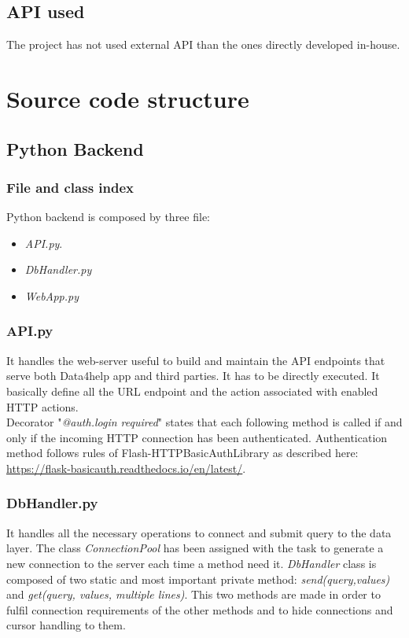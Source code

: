 \documentclass{article}
\begin{document}
\subsection{API used}
The project has not used external API than the ones directly developed in-house.

\section{Source code structure}
\subsection{Python Backend}
\subsubsection{File and class index}
Python backend is composed by three file:
\begin{itemize}
	\item \textit{API.py}.
	\item \textit{DbHandler.py}
	\item \textit{WebApp.py}
\end{itemize}

\subsubsection{API.py}
 It handles the web-server useful to build and maintain the API endpoints that serve both Data4help app and third parties. It has to be directly executed. It basically define all the URL endpoint and the action associated with enabled HTTP actions.\\
 Decorator "\textit{@auth.login required}" states that each following method is called if and only if the incoming HTTP connection has been authenticated. Authentication method follows rules of Flash-HTTPBasicAuthLibrary as described here: \url{https://flask-basicauth.readthedocs.io/en/latest/}.

 
 \subsubsection{DbHandler.py}
 It handles all the necessary operations to connect and submit query to the data layer. The class \textit{ConnectionPool} has been assigned with the task to generate a new connection to the server each time a method need it. \textit{DbHandler} class is composed of two static and most important private method: \textit{send(query,values)} and \textit{get(query, values, multiple lines)}. This two methods are made in order to fulfil connection requirements of the other methods and to hide connections and cursor handling to them.
\end{document}
